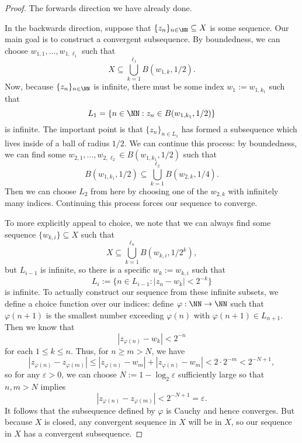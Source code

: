 \begin{proof}
	The forwards direction we have already done.

	In the backwards direction, suppose that $\{z_n\}_{n\in\NN}\subseteq X$ is some sequence. Our main goal is to construct a convergent subsequence. By boundedness, we can choose $w_{1,1},\ldots,w_{1,\ell_1}$ such that
	\[X\subseteq\bigcup_{k=1}^{\ell_1}B(w_{1,k},1/2).\]
	Now, because $\{z_n\}_{n\in\NN}$ is infinite, there must be some index $w_1:=w_{1,k_1}$ such that
	\[L_1=\{n\in\NN:z_n\in B(w_{1,k_1},1/2)\}\]
	is infinite. The important point is that $\{z_n\}_{n\in L_1}$ has formed a subsequence which lives inside of a ball of radius $1/2$. We can continue this process: by boundedness, we can find some $w_{2,1},\ldots,w_{2,\ell_2}\in B(w_{1,k_1},1/2)$ such that
	\[B(w_{1,k_1},1/2)\subseteq\bigcup_{k=1}^{\ell_2}B(w_{2,k},1/4).\]
	Then we can choose $L_2$ from here by choosing one of the $w_{2,k}$ with infinitely many indices. Continuing this process forces our sequence to converge.

	To more explicitly appeal to choice, we note that we can always find some sequence $\{w_{k,i}\}\subseteq X$ such that
	\[X\subseteq\bigcup_{k=1}^{\ell_n}B(w_{k,i},1/2^k),\]
	but $L_{i-1}$ is infinite, so there is a specific $w_k:=w_{k,i}$ such that
	\[L_i:=\{n\in L_{i-1}:|z_n-w_{k}|<2^{-k}\}\]
	is infinite. To actually construct our sequence from these infinite subsets, we define a choice function over our indices: define $\varphi:\NN\to\NN$ such that $\varphi(n+1)$ is the smallest number exceeding $\varphi(n)$ with $\varphi(n+1)\in L_{n+1}$. Then we know that
	\[|z_{\varphi(n)}-w_{k}|<2^{-n}\]
	for each $1\le k\le n$. Thus, for $n\ge m>N$, we have
	\[|z_{\varphi(n)}-z_{\varphi(m)}|\le|z_{\varphi(n)}-w_m|+|z_{\varphi(n)}-w_m|<2\cdot2^{-m}<2^{-N+1},\]
	so for any $\varepsilon>0$, we can choose $N:=1-\log_2\varepsilon$ sufficiently large so that $n,m>N$ implies
	\[|z_{\varphi(n)}-z_{\varphi(m)}|<2^{-N+1}=\varepsilon.\]
	It follows that the subsequence defined by $\varphi$ is Cauchy and hence converges. But because $X$ is closed, any convergent sequence in $X$ will be in $X$, so our sequence in $X$ has a convergent subsequence.
\end{proof}
